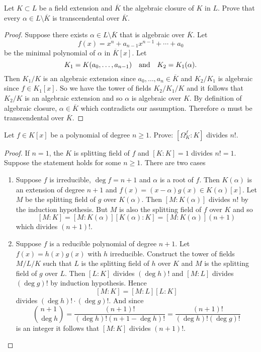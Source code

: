    \begin{ex}{21.32}
        Let $K\subset L$ be a field extension and $\overline{K}$ the algebraic closure of $K$ in $L$. 
        Prove that every $\alpha\in L\setminus\overline{K}$ is transcendental over $\overline{K}$.
    \end{ex}
    \begin{proof}
        Suppose there exists $\alpha\in L\setminus\overline{K}$ that is algebraic over $\overline{K}$.
        Let
        $$f(x)=x^n+a_{n-1}x^{n-1}+\cdots+a_0$$
        be the minimal polynomial of $\alpha$ in $\overline{K}[x]$. Let 
        $$K_1=K(a_0,\dots,a_{n-1})\quad\text{and}\quad K_2=K_1(\alpha).$$
        Then $K_1/K$ is an algebraic extension since $a_0,\dots,a_n\in\overline{K}$ and $K_2/K_1$ is algebraic since $f\in K_1[x]$.
        So we have the tower of fields $K_2/K_1/K$  and it follows that $K_2/K$ is an algebraic extension and so $\alpha$ is algebraic over $K$.
        By definition of algebraic closure, $\alpha\in\overline{K}$ which contradicts our assumption. 
        Therefore $\alpha$ must be transcendental over $\overline{K}$.
    \end{proof}

    \begin{ex}{21.35}
        Let $f\in K[x]$ be a polynomial of degree $n\geq 1$. Prove: $[\Omega_K^f:K]$ divides $n!$. 
    \end{ex}
    \begin{proof}
        If $n=1$, the $K$ is splitting field of $f$ and $[K:K]=1$ divides $n!=1$.
        Suppose the statement holds for some $n\geq 1$. There are two cases
        \begin{enumerate}
            \item Suppose $f$ is irreducible, $\deg f = n+1$ and $\alpha$ is a root of $f$.
                Then $K(\alpha)$ is an extension of degree $n+1$ and $f(x)=(x-\alpha)g(x)\in K(\alpha)[x]$.
                Let $M$ be the splitting field of $g$ over $K(\alpha)$. 
                Then $[M:K(\alpha)]$ divides $n!$ by the induction hypothesis.
                But $M$ is also the splitting field of $f$ over $K$ and so
                $$[M:K]=[M:K(\alpha)][K(\alpha):K]=[M:K(\alpha)](n+1)$$
                which divides $(n+1)!$.
            \item Suppose $f$ is a reducible polynomial of degree $n+1$. Let $f(x)=h(x)g(x)$ with $h$ irreducible. 
                Construct the tower of fields $M/L/K$ such that $L$ is the splitting field of $h$ over $K$ and $M$ is the splitting field of $g$ over $L$.
                Then $[L:K]$ divides $(\deg h)!$ and $[M:L]$ divides $(\deg g)!$ by induction hypothesis. 
                Hence 
                $$[M:K]=[M:L][L:K]$$ 
                divides $(\deg h)!\cdot(\deg g)!$.
                And since 
                $${n+1\choose \deg h}=\frac{(n+1)!}{(\deg h)!(n+1-\deg h)!}=\frac{(n+1)!}{(\deg h)!(\deg g)!}$$
                is an integer it follows that $[M:K]$ divides $(n+1)!$.
        \end{enumerate}
    \end{proof}

